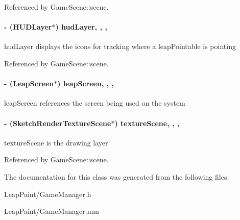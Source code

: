 Referenced by Game\-Scene\-::scene.

\hypertarget{interface_game_manager_ae286fb2f9d31810d73c7231a574b56b0}{
\paragraph[{hud\-Layer}]{\setlength{\rightskip}{0pt plus 5cm}-\/ ({\bf H\-U\-D\-Layer}$\ast$) hud\-Layer\hspace{0.3cm}{\ttfamily [read]}, {\ttfamily [write]}, {\ttfamily [nonatomic]}, {\ttfamily [strong]}}}\label{d4/d94/interface_game_manager_ae286fb2f9d31810d73c7231a574b56b0}
hud\-Layer displays the icons for tracking where a leap\-Pointable is pointing 

Referenced by Game\-Scene\-::scene.

\hypertarget{interface_game_manager_a85cb30e21c987f66855a762c6ba88096}{
\paragraph[{leap\-Screen}]{\setlength{\rightskip}{0pt plus 5cm}-\/ (Leap\-Screen$\ast$) leap\-Screen\hspace{0.3cm}{\ttfamily [read]}, {\ttfamily [write]}, {\ttfamily [nonatomic]}, {\ttfamily [strong]}}}\label{d4/d94/interface_game_manager_a85cb30e21c987f66855a762c6ba88096}
leap\-Screen references the screen being used on the system \hypertarget{interface_game_manager_a79a86ff991f39b3007d99ca61af21253}{
\paragraph[{texture\-Scene}]{\setlength{\rightskip}{0pt plus 5cm}-\/ ({\bf Sketch\-Render\-Texture\-Scene}$\ast$) texture\-Scene\hspace{0.3cm}{\ttfamily [read]}, {\ttfamily [write]}, {\ttfamily [nonatomic]}, {\ttfamily [strong]}}}\label{d4/d94/interface_game_manager_a79a86ff991f39b3007d99ca61af21253}
texture\-Scene is the drawing layer 

Referenced by Game\-Scene\-::scene.



The documentation for this class was generated from the following files\-:\begin{DoxyCompactItemize}
\item 
Leap\-Paint/Game\-Manager.\-h\item 
Leap\-Paint/Game\-Manager.\-mm\end{DoxyCompactItemize}
